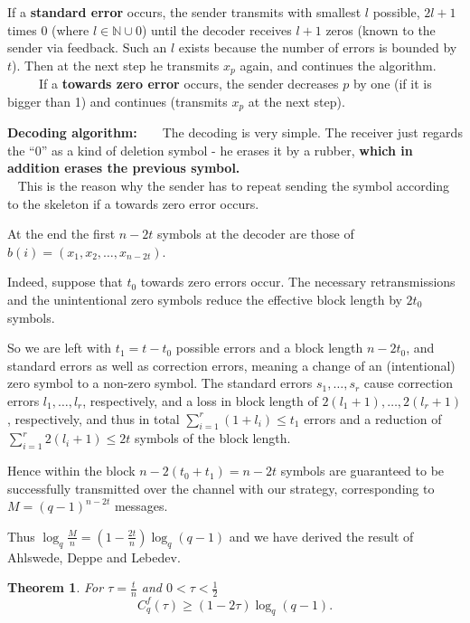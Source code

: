 \documentclass[conference]{IEEEtran}
\newtheorem{Theorem}{Theorem}
\def\NN{{\mathbb N}}
\begin{document}
If a {\bf standard error} occurs, the sender transmits with smallest $l$ possible, $2l+1$ times $0$
(where $l\in\NN\cup 0$) until the decoder receives
$l+1$ zeros (known to the sender via feedback. Such an $l$ exists because the number of errors is bounded by $t$). 
Then at the next
step he transmits 
$x_p$ again, and continues the algorithm.\\
 
 
 
If a {\bf towards zero error} occurs, the sender decreases $p$ by one
(if it is bigger than 1) and continues (transmits $x_p$ at the next step).
 

{\bf Decoding algorithm:}
 
 
The decoding is very simple. The receiver just regards the ``0'' as a
kind of deletion
symbol - he erases it by a rubber, {\bf which in addition erases the previous symbol.}\\
 
This is the reason why the sender has to repeat sending the symbol according to the skeleton if a
towards zero error occurs. 

At the end the first $n-2t$ symbols at the decoder are those of $b(i)=(x_1,x_2,\dots,x_{n-2t})$.

Indeed, suppose that $t_0$ towards zero errors occur. The necessary retransmissions and the unintentional zero symbols reduce the effective block length by $2t_0$ symbols.

So we are left with $t_1=t-t_0$ possible errors and a block length $n-2t_0$, and standard errors as well as
correction errors, meaning a change of an (intentional) zero symbol to a non-zero symbol. The standard errors $s_1,\dots,s_r$ cause
correction errors $l_1,\dots, l_r$, respectively, and a loss in block length of  $2(l_1+1),\dots, 2(l_r+1)$, respectively, and thus in total 
$\sum_{i=1}^r (1+l_i)\leq t_1$ errors and a reduction of $\sum_{i=1}^r 2(l_i+1)\leq 2t$ symbols of the block length.

Hence within the block $n-2(t_0+t_1)=n-2t$ symbols are guaranteed to be successfully transmitted over the channel with our strategy, corresponding to $M=(q-1)^{n-2t}$ messages.

Thus ${\log_q \frac Mn}=(1-{\frac {2t}n})\log_q (q-1)$ and we have derived the result of 
Ahlswede, Deppe and Lebedev.
\begin{Theorem}
For $\tau={\frac tn}$ and $0<\tau<{\frac 12}$
$$C^f_q(\tau)\geq (1-2\tau)\log_q(q-1).$$
\end{Theorem}
\end{document}
